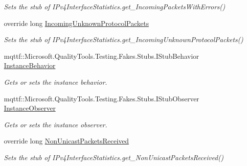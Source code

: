 \begin{DoxyCompactItemize}
\begin{DoxyCompactList}\small\item\em Sets the stub of I\-Pv4\-Interface\-Statistics.\-get\-\_\-\-Incoming\-Packets\-With\-Errors()\end{DoxyCompactList}\item 
override long \hyperlink{class_system_1_1_net_1_1_network_information_1_1_fakes_1_1_stub_i_pv4_interface_statistics_a23ad4c4f7d0f097bfda110bde839d683}{Incoming\-Unknown\-Protocol\-Packets}
\begin{DoxyCompactList}\small\item\em Sets the stub of I\-Pv4\-Interface\-Statistics.\-get\-\_\-\-Incoming\-Unknown\-Protocol\-Packets()\end{DoxyCompactList}\item 
mqttf\-::\-Microsoft.\-Quality\-Tools.\-Testing.\-Fakes.\-Stubs.\-I\-Stub\-Behavior \hyperlink{class_system_1_1_net_1_1_network_information_1_1_fakes_1_1_stub_i_pv4_interface_statistics_ac8604d1ec23f98b6e3fc1a4b15601f11}{Instance\-Behavior}
\begin{DoxyCompactList}\small\item\em Gets or sets the instance behavior.\end{DoxyCompactList}\item 
mqttf\-::\-Microsoft.\-Quality\-Tools.\-Testing.\-Fakes.\-Stubs.\-I\-Stub\-Observer \hyperlink{class_system_1_1_net_1_1_network_information_1_1_fakes_1_1_stub_i_pv4_interface_statistics_a66b8f62a482fe9059d0309545c5742c1}{Instance\-Observer}
\begin{DoxyCompactList}\small\item\em Gets or sets the instance observer.\end{DoxyCompactList}\item 
override long \hyperlink{class_system_1_1_net_1_1_network_information_1_1_fakes_1_1_stub_i_pv4_interface_statistics_ae12db4d986bea29284efc95e58db9578}{Non\-Unicast\-Packets\-Received}
\begin{DoxyCompactList}\small\item\em Sets the stub of I\-Pv4\-Interface\-Statistics.\-get\-\_\-\-Non\-Unicast\-Packets\-Received()\end{DoxyCompactList}\item 

\end{DoxyCompactItemize}
